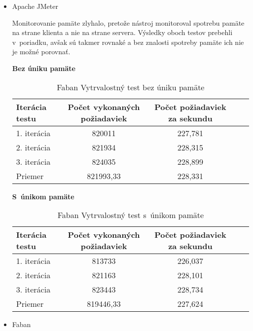 \documentclass[12pt,oneside,final]{fithesis-utf8}
\begin{document}
\begin{itemize}

\item Apache JMeter

Monitorovanie pamäte zlyhalo, pretože nástroj monitoroval spotrebu pamäte na strane klienta a nie na strane servera. Výsledky oboch testov prebehli v~poriadku, avšak sú takmer rovnaké a bez znalosti spotreby pamäte ich nie je možné porovnať.

\textbf{Bez úniku pamäte}

\begin{table}[H]
\begin{center}
\begin{tabular}{ | l | c | c | c | c |}
		\hline
		 \textbf{Iterácia testu} & \textbf{Počet vykonaných požiadaviek} & \textbf{Počet požiadaviek za sekundu} \\ \hline
		 1. iterácia & 820011 & 227,781 \\ \hline
		 2. iterácia & 821934 & 228,315 \\ \hline
		 3. iterácia & 824035 & 228,899 \\ \hline
		 Priemer & 821993,33 & 228,331 \\ \hline
		 
\end{tabular}
\end{center}
\caption{Faban Vytrvalostný test bez úniku pamäte}
\end{table}

\newpage
\textbf{S~únikom pamäte}

\begin{table}[H]
\begin{center}
\begin{tabular}{ | l | c | c | c | c |}
		\hline
		 \textbf{Iterácia testu} & \textbf{Počet vykonaných požiadaviek} & \textbf{Počet požiadaviek za sekundu} \\ \hline
		 1. iterácia & 813733 & 226,037 \\ \hline
		 2. iterácia & 821163 & 228,101 \\ \hline
		 3. iterácia & 823443 & 228,734 \\ \hline
		 Priemer & 819446,33 & 227,624 \\ \hline
		 
\end{tabular}
\end{center}
\caption{Faban Vytrvalostný test s~únikom pamäte}
\end{table}

\item Faban


\end{itemize}
\end{document}
